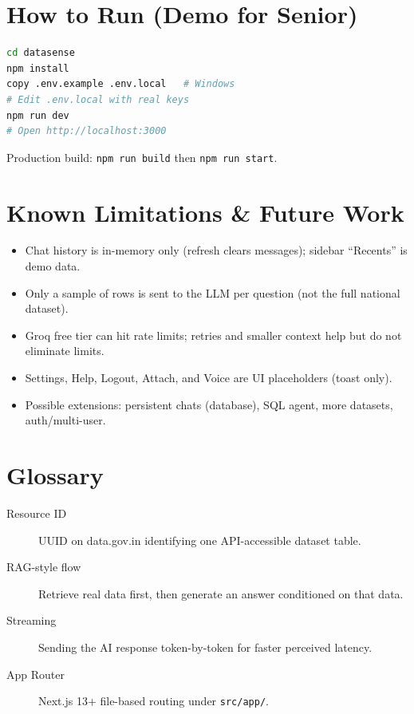 \documentclass[11pt,a4paper]{article}
\begin{document}
\section{How to Run (Demo for Senior)}

\begin{lstlisting}[language=bash]
cd datasense
npm install
copy .env.example .env.local   # Windows
# Edit .env.local with real keys
npm run dev
# Open http://localhost:3000
\end{lstlisting}

Production build: \texttt{npm run build} then \texttt{npm run start}.

\section{Known Limitations \& Future Work}

\begin{itemize}
  \item Chat history is in-memory only (refresh clears messages); sidebar ``Recents'' is demo data.
  \item Only a sample of rows is sent to the LLM per question (not the full national dataset).
  \item Groq free tier can hit rate limits; retries and smaller context help but do not eliminate limits.
  \item Settings, Help, Logout, Attach, and Voice are UI placeholders (toast only).
  \item Possible extensions: persistent chats (database), SQL agent, more datasets, auth/multi-user.
\end{itemize}

\section{Glossary}

\begin{description}
  \item[Resource ID] UUID on data.gov.in identifying one API-accessible dataset table.
  \item[RAG-style flow] Retrieve real data first, then generate an answer conditioned on that data.
  \item[Streaming] Sending the AI response token-by-token for faster perceived latency.
  \item[App Router] Next.js 13+ file-based routing under \texttt{src/app/}.
\end{description}
\end{document}
